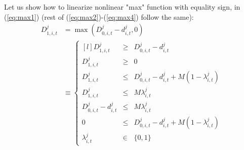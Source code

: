 \documentclass[12pt,a4paper]{article}
\begin{document}
Let us show how to linearize nonlinear "max" function with equality sign, in (\ref{eq:max1}) (rest of (\ref{eq:max2})-(\ref{eq:max4}) follow the same): \\
\begin{align}
D_{1,i,t}^{j} & = \max(D_{0,i,t}^{j}-d_{i,t}^{j},0) 
\qquad \qquad \qquad \qquad \qquad \nonumber \\
& \equiv
\left\{
\begin{matrix*}[l]
D_{1,i,t}^{j} & \geq & D_{0,i,t}^{j}-d_{i,t}^{j} \\
D_{1,i,t}^{j} & \geq & 0 \\
D_{1,i,t}^{j} & \leq & D_{0,i,t}^{j}-d_{i,t}^{j} + M (1-\lambda_{i,t}^{j}) \\
D_{1,i,t}^{j} & \leq & M \lambda_{i,t}^{j}\\
D_{0,i,t}^{j}-d_{i,t}^{j} & \leq & M \lambda_{i,t}^{j} \\
0 & \leq & D_{0,i,t}^{j}-d_{i,t}^{j} + M (1- \lambda_{i,t}^{j}) \\
\lambda_{i,t}^{j} & \in & \{0,1\}
\end{matrix*} \right.
\end{align}
\end{document}
